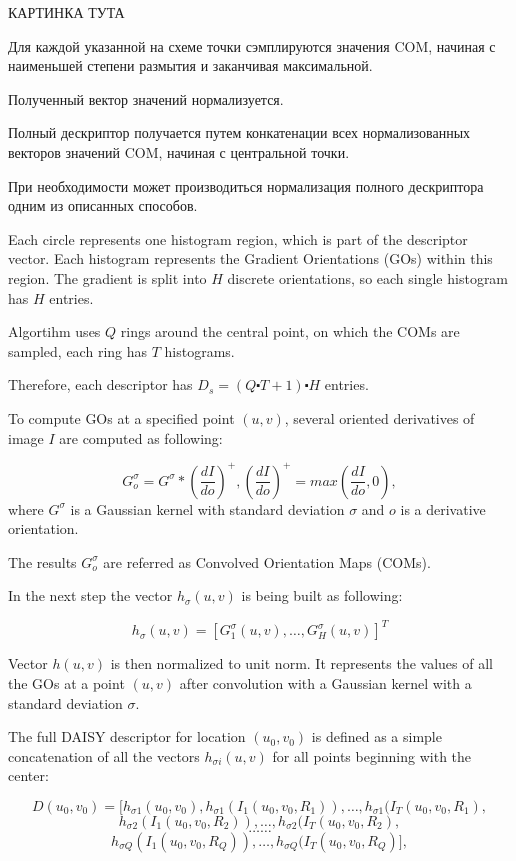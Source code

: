 {{{{		КАРТИНКА ТУТА
		
		Для каждой указанной на схеме точки сэмплируются значения COM, начиная с наименьшей степени размытия и заканчивая максимальной. 
		
		Полученный вектор значений нормализуется. 
		
		Полный дескриптор получается путем конкатенации всех нормализованных векторов значений COM, начиная с центральной точки. 
		
		При необходимости может производиться нормализация полного дескриптора одним из описанных способов. 
		
		Each circle represents one histogram region, which is part of the descriptor vector. Each histogram represents the Gradient Orientations (GOs) within this region. The gradient is split into $H$ discrete orientations, so each single histogram has $H$ entries.
		
		Algortihm uses $Q$ rings around the central point, on which the COMs are sampled, each ring has $T$ histograms.
		
		Therefore, each descriptor has $D_s=(Q \centerdot T+1)\centerdot H$ entries.
		
		To compute GOs at a specified point $(u,v)$, several oriented derivatives of image $I$ are computed as following:
		
		$$G_o^\sigma = G^\sigma * \left(\dfrac{dI}{do}\right)^+ , \left(\dfrac{dI}{do}\right)^+ = max\left(\dfrac{dI}{do}, 0\right),$$
		where $ G^\sigma $ is a Gaussian kernel with standard deviation $ \sigma $ and $o$ is a derivative orientation.
		
		The results $G_o^{\sigma}$ are referred as Convolved Orientation Maps (COMs).
		
		In the next step the vector $h_\sigma(u,v)$ is being built as following:
		
		$$h_\sigma(u,v) = \left[G_1^\sigma(u,v), \dots, G_H^\sigma(u,v)\right]^T$$
		
		Vector $h(u,v)$ is then normalized to unit norm. It represents the values of all the GOs at a point $(u,v)$ after convolution with a Gaussian kernel with a standard deviation $\sigma$.
		
		The full DAISY descriptor for location $(u_0,v_0)$ is defined as a simple concatenation of all the vectors $h_{\sigma i}(u,v)$ for all points beginning with the center:
		
		$$D(u_0,v_0) = [h_{\sigma 1}(u_0, v_0), h_{\sigma 1}(I_1(u_0, v_0, R_1)), \dots, h_{\sigma 1}(I_T(u_0, v_0, R_1),$$ 
		$$h_{\sigma 2}(I_1(u_0, v_0, R_2)), \dots, h_{\sigma 2}(I_T(u_0, v_0, R_2),$$
		$$\dots \dots$$
		$$h_{\sigma Q}(I_1(u_0, v_0, R_Q)), \dots, h_{\sigma Q}(I_T(u_0, v_0, R_Q)],$$
		
}}}}
